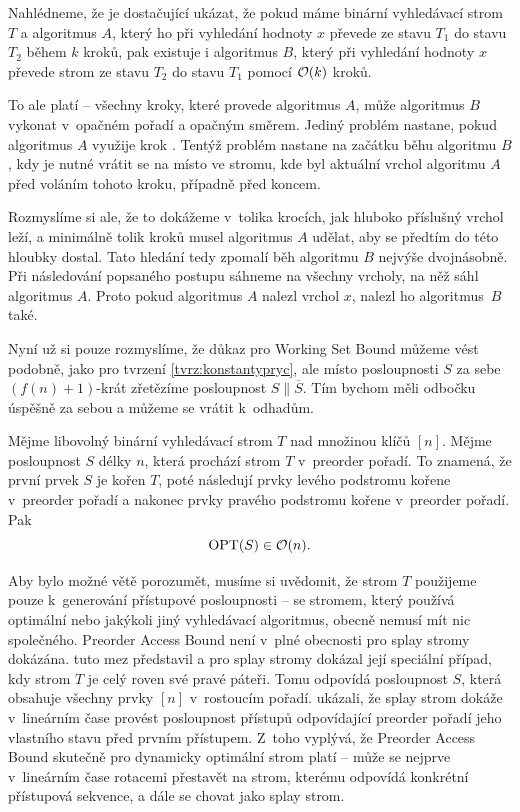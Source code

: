 \begin{dukaz}
Nahlédneme, že je dostačující ukázat, že pokud máme binární vyhledávací strom $T$ a
algoritmus $A$, který ho při vyhledání hodnoty $x$ převede ze stavu $T_1$ do stavu
$T_2$ během $k$ kroků, pak existuje i algoritmus $B$, který při vyhledání hodnoty
$x$ převede strom ze stavu $T_2$ do stavu $T_1$ pomocí $\mathcal O(k)$ kroků.

To ale platí -- všechny kroky, které provede algoritmus $A$, může algoritmus $B$
vykonat v~opačném pořadí a opačným směrem. Jediný problém nastane, pokud
algoritmus $A$ využije krok . Tentýž problém nastane na
začátku běhu algoritmu $B$, kdy je nutné vrátit se na místo ve stromu, kde byl
aktuální vrchol algoritmu $A$ před voláním tohoto kroku, případně před koncem.

Rozmyslíme si ale, že to dokážeme v~tolika krocích, jak hluboko příslušný
vrchol leží, a minimálně tolik kroků musel algoritmus $A$ udělat, aby se předtím
do této hloubky dostal. Tato hledání tedy zpomalí běh algoritmu $B$ nejvýše
dvojnásobně. Při následování popsaného postupu sáhneme na všechny vrcholy, na něž
sáhl algoritmus $A$. Proto pokud algoritmus $A$ nalezl vrchol $x$, nalezl ho
algoritmus~$B$ také.
\end{dukaz}

Nyní už si pouze rozmyslíme, že důkaz pro Working Set Bound můžeme vést
podobně, jako pro tvrzení \ref{tvrz:konstantypryc}, ale místo posloupnosti $S$ za sebe
$(f(n)+1)$-krát zřetězíme posloupnost $S\|\overline S$. Tím bychom měli odbočku
úspěšně za sebou a můžeme se vrátit k~odhadům. 

\begin{veta}
Mějme libovolný binární vyhledávací strom $T$ nad množinou klíčů $[n]$. Mějme posloupnost $S$ délky $n$, která prochází strom $T$ v~preorder pořadí. To znamená, že první prvek $S$ je kořen $T$, poté následují prvky levého podstromu kořene v~preorder pořadí a nakonec prvky pravého podstromu kořene v~preorder pořadí. Pak $$\operatorname{OPT}(S)\in \mathcal O(n).$$
\end{veta}

Aby bylo možné větě porozumět, musíme si uvědomit, že strom $T$ použijeme pouze
k~generování přístupové posloupnosti -- se stromem, který používá optimální nebo
jakýkoli jiný vyhledávací algoritmus, obecně nemusí mít nic společného. Preorder
Access Bound není v~plné obecnosti pro splay stromy dokázána.
\citet{preordertarjan} tuto mez představil a pro splay stromy dokázal její
speciální případ, kdy strom $T$ je celý roven své pravé páteři. Tomu odpovídá
posloupnost $S$, která obsahuje všechny prvky $[n]$ v~rostoucím pořadí.
\citet{preordersplay} ukázali, že splay strom dokáže v~lineárním čase provést
posloupnost přístupů odpovídající preorder pořadí jeho vlastního stavu před prvním
přístupem. Z~toho vyplývá, že Preorder Access Bound skutečně pro dynamicky
optimální strom platí -- může se nejprve v~lineárním čase rotacemi přestavět na strom,
kterému odpovídá konkrétní přístupová sekvence, a dále se chovat jako splay
strom. 

